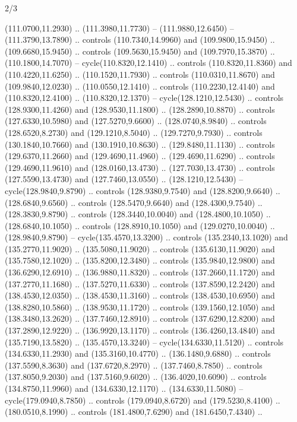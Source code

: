 \begin{flagdescription}{2/3}
\begin{scope}[xshift=0.5\flaglength,yshift=0.5\flagwidth,scale=\stretchfactor]
\begin{scope}[scale=0.001645\flagwidth,yshift=65mm,xshift=-63mm]
\begin{scope}[y=0.80pt, x=0.80pt, yscale=-1,]
\begin{scope}[cm={{1.33333,0.0,0.0,1.33333,(0.0,1e-05)}}]
  (111.0700,11.2930) .. (111.3980,11.7730) -- (111.9880,12.6450) --
  (111.3790,13.7890) .. controls (110.7340,14.9960) and (109.9800,15.9450) ..
  (109.6680,15.9450) .. controls (109.5630,15.9450) and (109.7970,15.3870) ..
  (110.1800,14.7070) -- cycle(110.8320,12.1410) .. controls (110.8320,11.8360)
  and (110.4220,11.6250) .. (110.1520,11.7930) .. controls (110.0310,11.8670)
  and (109.9840,12.0230) .. (110.0550,12.1410) .. controls (110.2230,12.4140)
  and (110.8320,12.4100) .. (110.8320,12.1370) -- cycle(128.1210,12.5430) ..
  controls (128.9300,11.4260) and (128.9530,11.1800) .. (128.2890,10.8870) ..
  controls (127.6330,10.5980) and (127.5270,9.6600) .. (128.0740,8.9840) ..
  controls (128.6520,8.2730) and (129.1210,8.5040) .. (129.7270,9.7930) ..
  controls (130.1840,10.7660) and (130.1910,10.8630) .. (129.8480,11.1130) ..
  controls (129.6370,11.2660) and (129.4690,11.4960) .. (129.4690,11.6290) ..
  controls (129.4690,11.9610) and (128.0160,13.4730) .. (127.7030,13.4730) ..
  controls (127.5590,13.4730) and (127.7460,13.0550) .. (128.1210,12.5430) --
  cycle(128.9840,9.8790) .. controls (128.9380,9.7540) and (128.8200,9.6640) ..
  (128.6840,9.6560) .. controls (128.5470,9.6640) and (128.4300,9.7540) ..
  (128.3830,9.8790) .. controls (128.3440,10.0040) and (128.4800,10.1050) ..
  (128.6840,10.1050) .. controls (128.8910,10.1050) and (129.0270,10.0040) ..
  (128.9840,9.8790) -- cycle(135.4570,13.3200) .. controls (135.2340,13.1020)
  and (135.2770,11.9020) .. (135.5080,11.9020) .. controls (135.6130,11.9020)
  and (135.7580,12.1020) .. (135.8200,12.3480) .. controls (135.9840,12.9800)
  and (136.6290,12.6910) .. (136.9880,11.8320) .. controls (137.2660,11.1720)
  and (137.2770,11.1680) .. (137.5270,11.6330) .. controls (137.8590,12.2420)
  and (138.4530,12.0350) .. (138.4530,11.3160) .. controls (138.4530,10.6950)
  and (138.8280,10.5860) .. (138.9530,11.1720) .. controls (139.1560,12.1050)
  and (138.3480,13.2620) .. (137.7460,12.8910) .. controls (137.6290,12.8200)
  and (137.2890,12.9220) .. (136.9920,13.1170) .. controls (136.4260,13.4840)
  and (135.7190,13.5820) .. (135.4570,13.3240) -- cycle(134.6330,11.5120) ..
  controls (134.6330,11.2930) and (135.3160,10.4770) .. (136.1480,9.6880) ..
  controls (137.5590,8.3630) and (137.6720,8.2970) .. (137.7460,8.7850) ..
  controls (137.8050,9.2030) and (137.5160,9.6020) .. (136.4020,10.6090) ..
  controls (134.8750,11.9960) and (134.6330,12.1170) .. (134.6330,11.5080) --
  cycle(179.0940,8.7850) .. controls (179.0940,8.6720) and (179.5230,8.4100) ..
  (180.0510,8.1990) .. controls (181.4800,7.6290) and (181.6450,7.4340) ..

\end{scope}
\end{scope}
\end{scope}
\end{scope}
\end{flagdescription}
